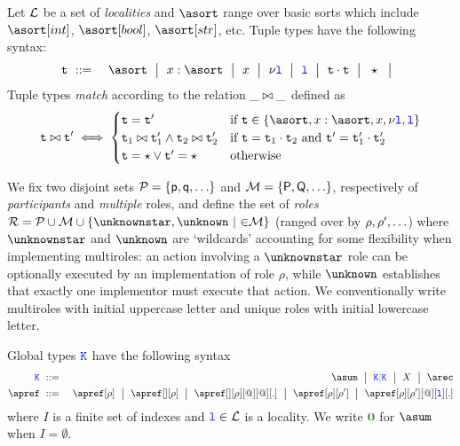 %
Let $\mathcal{L}$ be a set of \emph{localities} and $\asort$ range over
basic sorts which include $\asort[int]$, $\asort[bool]$,
$\asort[str]$, etc.
%
Tuple types have the following syntax:
\begin{eqnarray*}
  \atuple & \bnfdef & \asort \bnfmid
                      x : \asort \bnfmid
                      x  \bnfmid
                      \nu \aloc \bnfmid
                      \aloc \bnfmid
                      \atuple \cdot \atuple \bnfmid
                      \wildcard \bnfmid
\end{eqnarray*}
%
Tuple types \emph{match} according to the relation $\_ \bowtie \_$
defined as
\[
  \atuple \matches \atuple' \iff
  \begin{cases}
    \atuple = \atuple'  
    & 
    \text{if $\atuple\in\{\asort, x : \asort, x, \nu \aloc, \aloc\}$}
    \\
    \atuple_1 \matches \atuple'_1
    \land \atuple_2 \matches \atuple'_2
    &
    \text{if } \atuple = \atuple_1 \cdot \atuple_2
    \text{ and }  \atuple' = \atuple'_1 \cdot \atuple'_2
    \\
    \atuple = \wildcard \vee \atuple' = \wildcard & \text{otherwise}
  \end{cases}
\]

%

We fix two disjoint sets $\participants = \{\ptp p, \ptp q, \ldots\}$
and $\multiroles = \{\amulti P, \amulti Q, \ldots \}$, respectively of
\emph{participants} and \emph{multiple} roles, and define the set of
\emph{roles} $\roleset = \participants \cup \multiroles \cup
\{\unknownstar, \unknown\ |\ \amulti\in\multiroles\}$ (ranged over by
$\rho, \rho', \ldots$) where $\unknownstar$ and $\unknown$ are
`wildcards' accounting for some flexibility when implementing
multiroles: an action involving a $\unknownstar$ role can be
optionally executed by an implementation of role $\rho$, while
$\unknown$ establishes that exactly one implementor must execute that
action.
%
We conventionally write multiroles with initial uppercase letter and
unique roles with initial lowercase letter.

Global types $\texttt{\textcolor{blue}K}$ have the following syntax
\begin{eqnarray*}
  \aK & \bnfdef & \asum \bnfmid
                  \aK \parop \aK \bnfmid
                  X \bnfmid
                  \arec
  \\
  \apref & \bnfdef & \apref[\arole] \bnfmid
                         \apref[{}][\arole] \bnfmid
                         \apref[{}][\arole][@][@][.] \bnfmid
                         \apref[\arole][\arole'] \bnfmid
                         \apref[\arole][\arole'][@][\aloc][.]
\end{eqnarray*}
where $I$ is a finite set of indexes and $\texttt{\color{blue}l} \in \mathcal{L}$ is a
locality. We write $\nil$ for $\asum$ when $I = \emptyset$.

